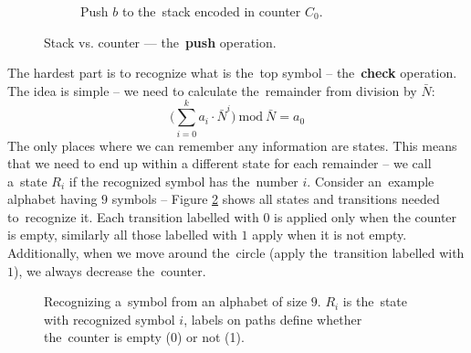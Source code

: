 \documentclass[english,shortabstract,mgr]{iithesis}
\begin{document}
\begin{figure}[H]
\begin{subfigure}[b]{0.6\textwidth}
\begin{tikzpicture}[stack/.style={rectangle split, rectangle split parts=#1,draw, anchor=center}]
    \end{tikzpicture}

    \captionsetup{font=footnotesize}
    \caption{Push $b$ to the~stack encoded in counter $C_0$.}

  \end{subfigure}

  \caption{Stack vs. counter --- the~\textbf{push} operation.}
  \label{fig:push_operation}

\end{figure}


The hardest part is to recognize what is the~top symbol -- the~\textbf{check} operation.
The idea is simple -- we need to calculate the~remainder from division by $\bar{N}$:
$$ \Bigg( \sum_{i=0}^{k} a_i \cdot \bar{N}^i \Bigg) \ \mathrm{mod} \ \bar{N} = a_0 $$
The only places where we can remember any information are states. This means that we need
to end up within a different state for each remainder -- we call a~state $R_i$ if
the recognized symbol has the~number $i$. Consider an~example alphabet having $9$ symbols -- Figure
\ref{fig:check} shows all states and transitions needed to~recognize it. Each
transition labelled with $0$ is applied only when the counter is empty, similarly
all those labelled with $1$ apply when it is not empty. Additionally, when we move around
the~circle (apply the~transition labelled with $1$), we always decrease the~counter.

\begin{figure}[H]
\centering
{}

\caption{Recognizing a~symbol from an alphabet of size $9$. $R_i$ is the~state with recognized
  symbol $i$, labels on paths define whether the~counter is empty (0) or not (1).}
\label{fig:check}

\end{figure}
\end{document}
